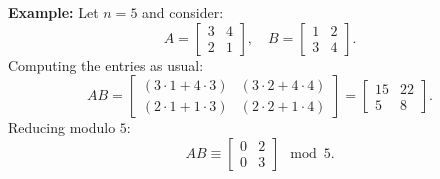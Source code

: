 \noindent \textbf{Example:} Let $ n = 5 $ and consider:
\[
A = \begin{bmatrix} 3 & 4 \\ 2 & 1 \end{bmatrix}, \quad
B = \begin{bmatrix} 1 & 2 \\ 3 & 4 \end{bmatrix}.
\]
Computing the entries as usual:
\[
AB = \begin{bmatrix} 
(3\cdot1 + 4\cdot3) & (3\cdot2 + 4\cdot4) \\ 
(2\cdot1 + 1\cdot3) & (2\cdot2 + 1\cdot4) 
\end{bmatrix} 
= \begin{bmatrix} 15 & 22 \\ 5 & 8 \end{bmatrix}.
\]
Reducing modulo $ 5 $:
\[
AB \equiv \begin{bmatrix} 0 & 2 \\ 0 & 3 \end{bmatrix} \mod 5.
\]